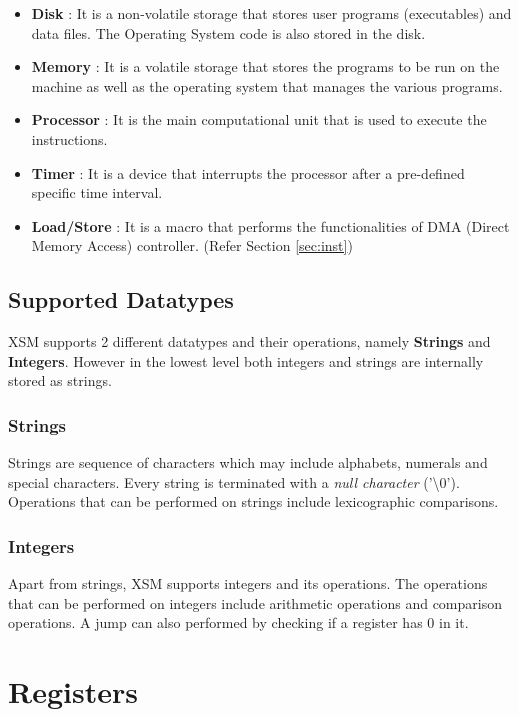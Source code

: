 \documentclass[11pt]{report}
\begin{document}
\begin{itemize}
\item \textbf{Disk} : It is a non-volatile storage that stores user programs (executables) and data files. The Operating System code is also stored in the disk.

\item \textbf{Memory} : It is a volatile storage that stores the programs to be run on the machine as well as the operating system that manages the various programs.
\item \textbf{Processor} : It is the main computational unit that is used to execute the instructions.
\item \textbf{Timer} : It is a device that interrupts the processor after a pre-defined specific time interval.
\item \textbf{Load/Store} : It is a macro that performs the functionalities of DMA (Direct Memory Access) controller. (Refer Section \ref{sec:inst})
\end{itemize}


\section{Supported Datatypes}

XSM supports 2 different datatypes and their operations, namely \textbf{Strings} and \textbf{Integers}. However in the lowest level both integers and strings are internally stored as strings.

\subsection{Strings} Strings are sequence of characters which may include alphabets, numerals and special characters. Every string is terminated with a \textit{null character} ('\textbackslash 0'). Operations that can be performed on strings include lexicographic comparisons.

\subsection{Integers} Apart from strings, XSM supports integers and its operations. The operations that can be performed on integers include arithmetic operations and comparison operations. A jump can also performed by checking if a register has 0 in it.



\chapter{Registers}
\end{document}
